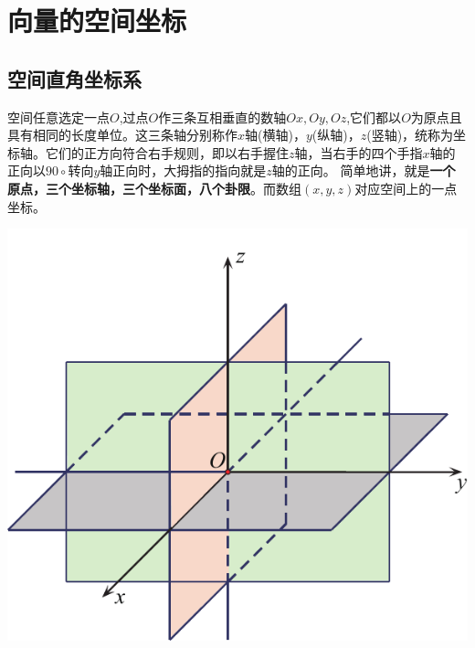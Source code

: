\section{向量的空间坐标}
\subsection{空间直角坐标系}

\noindent
\begin{minipage}{0.6\linewidth}
\hspace*{2em}空间任意选定一点$O$,过点$O$作三条互相垂直的数轴$Ox,Oy,Oz$,它们都以$O$为原点且具有相同的长度单位。这三条轴分别称作$x$轴(横轴)，$y$(纵轴)，$z$(竖轴)，统称为坐标轴。它们的正方向符合右手规则，即以右手握住$z$轴，当右手的四个手指$x$轴的正向以$90\circ$转向$y$轴正向时，大拇指的指向就是$z$轴的正向。
\hspace*{2em} 简单地讲，就是\textbf{一个原点，三个坐标轴，三个坐标面，八个卦限}。而数组$(x,y,z)$对应空间上的一点坐标。
\end{minipage}
\begin{minipage}{0.4\linewidth}
	\centering
	\includegraphics[width = 0.75\linewidth]{pic/C-5/空间坐标}
	\vspace*{-1em}
	\label{空间直角坐标系}
\end{minipage}

